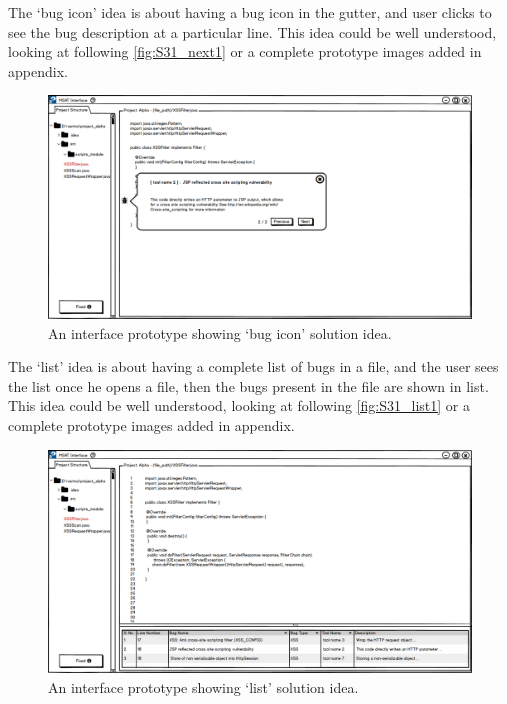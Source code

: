 The ‘bug icon’ idea is about having a bug icon in the gutter, and user clicks to see the bug description at a particular line. This idea could be well understood, looking at following \autoref{fig:S31_next1} or a complete prototype images added in appendix. \\


\begin{figure}[hbt!]
	\centering
	\includegraphics[width=\linewidth]{figures/solution_ideas_snaps/S31_next}
	\caption{An interface prototype showing ‘bug icon’ solution idea.}
	\label{fig:S31_next1}
\end{figure} 

The ‘list’ idea is about having a complete list of bugs in a file, and the user sees the list once he opens a file, then the bugs present in the file are shown in list. This idea could be well understood, looking at following \autoref{fig:S31_list1} or a complete prototype images added in appendix. \\


\begin{figure}[hbt!]
	\centering
	\includegraphics[width=\linewidth]{figures/solution_ideas_snaps/S31_list}
	\caption{An interface prototype showing ‘list’ solution idea.}
	\label{fig:S31_list1}
\end{figure} 

